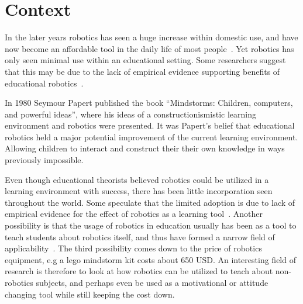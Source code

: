 \section{Context}
	In the later years robotics has seen a huge increase within domestic use, and have now become an affordable tool in the daily life of most people~\cite{kara2003sizing,hsiu2003designing}.
	Yet robotics has only seen minimal use within an educational setting. Some researchers suggest that this may be due to the lack of empirical evidence
	supporting benefits of educational robotics~\cite{williams2007acquisition}. 
	
\bigskip\noindent
In 1980 Seymour Papert published the book ``Mindstorms: Children, computers, and powerful ideas''\cite{papert1980mindstorms}, where his ideas of a constructionismistic 
learning environment and robotics were presented. It was Papert's belief that educational robotics held a major potential improvement of the current learning environment.
Allowing children to interact and construct their their own knowledge in ways previously impossible. 

\bigskip\noindent
Even though educational theorists believed robotics could be utilized in a learning environment with success, there has been little
incorporation seen throughout the world. 
Some speculate that the limited adoption is due to lack of empirical evidence for the effect of robotics as a learning tool~\cite{williams2007acquisition}.  
Another possibility is that the usage of robotics in education usually has been as a tool to teach students about robotics itself, 
and thus have formed a narrow field of applicability~\cite{rusk2008new}. 
The third possibility comes down to the price of robotics equipment, e.g a lego mindstorm kit costs about 650 USD. 
An interesting field of research is therefore to look at how robotics can be utilized to teach about non-robotics subjects, and perhaps even be used as a motivational or attitude changing tool while still keeping the cost down. 

	
